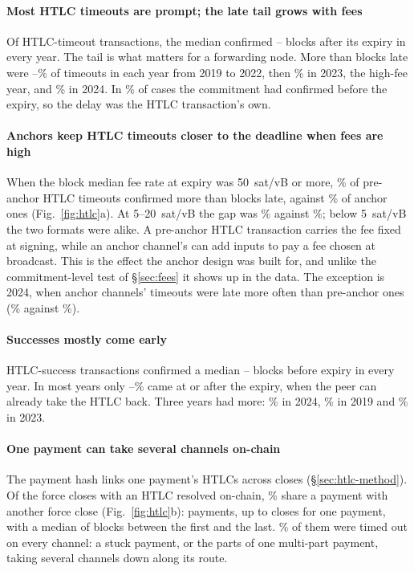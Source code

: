 \paragraph{Most HTLC timeouts are prompt; the late tail grows with fees}
Of \HtlcTimeoutTxs{} HTLC-timeout transactions, the median confirmed \HtlcTimeoutMedMin--\HtlcTimeoutMedMax{} blocks
after its expiry in every year. The tail is what matters for a forwarding node. More than \HtlcMarginTight{} blocks
late were \HtlcLateEarlyMin--\HtlcLateEarlyMax\% of timeouts in each year from 2019 to 2022, then
\HtlcLateTwentyThree\% in 2023, the high-fee year, and \HtlcLateTwentyFour\% in 2024. In \HtlcCommitBeforeExpiryPct\%
of cases the commitment had confirmed before the expiry, so the delay was the HTLC transaction's own.

\paragraph{Anchors keep HTLC timeouts closer to the deadline when fees are high}
When the block median fee rate at expiry was 50~sat/vB or more, \HtlcLateSpikeLegacy\% of pre-anchor HTLC timeouts
confirmed more than \HtlcMarginTight{} blocks late, against \HtlcLateSpikeAnchor\% of anchor ones
(Fig.~\ref{fig:htlc}a). At 5--20~sat/vB the gap was \HtlcLateMidLegacy\% against \HtlcLateMidAnchor\%; below
5~sat/vB the two formats were alike. A pre-anchor HTLC transaction carries the fee fixed at signing, while an anchor
channel's can add inputs to pay a fee chosen at broadcast. This is the effect the anchor design was built for, and
unlike the commitment-level test of \S\ref{sec:fees} it shows up in the data.
The exception is 2024, when anchor channels' timeouts were late more often than pre-anchor ones
(\HtlcLateTwentyFourAnchor\% against \HtlcLateTwentyFourLegacy\%).

\paragraph{Successes mostly come early}
HTLC-success transactions confirmed a median \HtlcSuccessMarginMin--\HtlcSuccessMarginMax{} blocks before expiry in
every year. In most years only \HtlcSuccessLateMinOther--\HtlcSuccessLateMaxOther\% came at or after the expiry, when
the peer can already take the HTLC back. Three years had more: \HtlcSuccessLateTwentyFour\% in 2024,
\HtlcSuccessLateNineteen\% in 2019 and \HtlcSuccessLateTwentyThree\% in 2023.

\paragraph{One payment can take several channels on-chain}
The payment hash links one payment's HTLCs across closes (\S\ref{sec:htlc-method}). Of the force closes with an HTLC resolved on-chain, \CascadePct\% share a payment with another force close
(Fig.~\ref{fig:htlc}b): \CascadePayments{} payments, up to \CascadeMaxCloses{} closes for one payment, with a median
of \CascadeSpanMed{} blocks between the first and the last. \CascadeAllTimeoutPct\% of them were timed out on every
channel: a stuck payment, or the parts of one multi-part payment, taking several channels down along its route.

